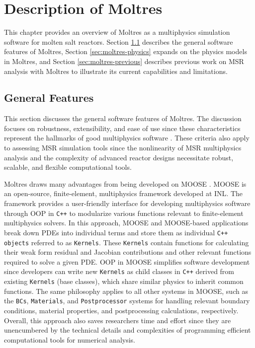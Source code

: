 \section{Description of Moltres} \label{sec:moltres-description}

This chapter provides an overview of Moltres as a multiphysics
simulation software for molten salt reactors. 
Section \ref{sec:moltres-features}
describes the general software features of Moltres, Section
\ref{sec:moltres-physics} expands on the physics models in Moltres, and Section
\ref{sec:moltres-previous} describes previous work on \gls{MSR} analysis with Moltres to illustrate
its current capabilities and limitations.

\subsection{General Features} \label{sec:moltres-features}

This section discusses the general software features of Moltres. The
discussion focuses on robustness, extensibility, and ease of use
since these characteristics represent the hallmarks of good multiphysics
software \cite{keyes_multiphysics_2013}. These criteria also apply to
assessing \gls{MSR} simulation tools since the nonlinearity of \gls{MSR}
multiphysics analysis and the complexity of advanced reactor designs
necessitate robust, scalable, and flexible computational tools.

Moltres draws many advantages from being developed on MOOSE
\cite{giudicelli_30_2024}. MOOSE is an open-source, finite-element,
multiphysics framework developed at \gls{INL}. The framework provides a
user-friendly interface for developing multiphysics software through
\gls{OOP} in \texttt{C++} to modularize various
functions relevant to finite-element multiphysics solvers. In this approach,
MOOSE and MOOSE-based applications break down \glspl{PDE} into individual terms
and store them as individual \texttt{C++ objects} referred to as
\texttt{Kernels}. These \texttt{Kernels} contain functions for calculating
their weak form residual and Jacobian
contributions and other relevant functions required to solve a given
\gls{PDE}. \gls{OOP} in MOOSE simplifies software development
since developers can write new \texttt{Kernels} as child classes in
\texttt{C++} derived from existing \texttt{Kernels} (base classes), which share
similar physics to inherit common functions.
The same philosophy applies to all other systems in MOOSE, such as
the \texttt{BCs}, \texttt{Materials}, and \texttt{Postprocessor}
systems for handling relevant boundary conditions, material properties, and
postprocessing calculations, respectively. Overall, this approach also saves
researchers time and effort since they are unencumbered by the technical details
and complexities of programming efficient computational tools for
numerical analysis.

